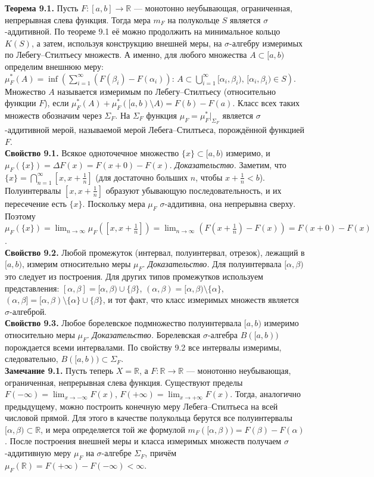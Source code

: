 \documentclass[12pt]{article}
\begin{document}
\textbf{Теорема 9.1.} Пусть $F:[a,b]\to\mathbb{R}$ — монотонно неубывающая, ограниченная, непрерывная слева функция. Тогда мера $m_F$ на полукольце $S$ является $\sigma$-аддитивной. По теореме 9.1 её можно продолжить на минимальное кольцо $K(S)$, а затем, используя конструкцию внешней меры, на $\sigma$-алгебру измеримых по Лебегу–Стилтьесу множеств. А именно, для любого множества $A\subset[a,b)$ определим внешнюю меру: $\mu_F^*(A)=\inf\left(\sum_{i=1}^\infty(F(\beta_i)-F(\alpha_i)):\,A\subset\bigcup_{i=1}^\infty[\alpha_i,\beta_i),\,[\alpha_i,\beta_i)\in S\right)$. Множество $A$ называется измеримым по Лебегу–Стилтьесу (относительно функции $F$), если $\mu_F^*(A)+\mu_F^*([a,b)\setminus A)=F(b)-F(a)$. Класс всех таких множеств обозначим через $\Sigma_F$. На $\Sigma_F$ функция $\mu_F=\mu_F^*|_{\Sigma_F}$ является $\sigma$-аддитивной мерой, называемой мерой Лебега–Стилтьеса, порождённой функцией $F$. \\\textbf{Свойство 9.1.} Всякое одноточечное множество $\{x\}\subset[a,b)$ измеримо, и $\mu_F(\{x\})=\Delta F(x)=F(x+0)-F(x)$. \textit{Доказательство.} Заметим, что $\{x\}=\bigcap_{n=1}^\infty[x,x+\tfrac{1}{n}]$ (для достаточно больших $n$, чтобы $x+\tfrac{1}{n}<b$). Полуинтервалы $[x,x+\tfrac{1}{n}]$ образуют убывающую последовательность, и их пересечение есть $\{x\}$. Поскольку мера $\mu_F$ $\sigma$-аддитивна, она непрерывна сверху. Поэтому $\mu_F(\{x\})=\lim_{n\to\infty}\mu_F([x,x+\tfrac{1}{n}])=\lim_{n\to\infty}(F(x+\tfrac{1}{n})-F(x))=F(x+0)-F(x)$. \\\textbf{Свойство 9.2.} Любой промежуток (интервал, полуинтервал, отрезок), лежащий в $[a,b)$, измерим относительно меры $\mu_F$. \textit{Доказательство.} Для полуинтервала $[\alpha,\beta)$ это следует из построения. Для других типов промежутков используем представления: $[\alpha,\beta]=[\alpha,\beta)\cup\{\beta\}$, $(\alpha,\beta)=[\alpha,\beta)\setminus\{\alpha\}$, $(\alpha,\beta]=[\alpha,\beta)\setminus\{\alpha\}\cup\{\beta\}$, и тот факт, что класс измеримых множеств является $\sigma$-алгеброй. \\\textbf{Свойство 9.3.} Любое борелевское подмножество полуинтервала $[a,b)$ измеримо относительно меры $\mu_F$. \textit{Доказательство.} Борелевская $\sigma$-алгебра $B([a,b))$ порождается всеми интервалами. По свойству 9.2 все интервалы измеримы, следовательно, $B([a,b))\subset\Sigma_F$. \\\textbf{Замечание 9.1.} Пусть теперь $X=\mathbb{R}$, а $F:\mathbb{R}\to\mathbb{R}$ — монотонно неубывающая, ограниченная, непрерывная слева функция. Существуют пределы $F(-\infty)=\lim_{x\to-\infty}F(x)$, $F(+\infty)=\lim_{x\to+\infty}F(x)$. Тогда, аналогично предыдущему, можно построить конечную меру Лебега–Стилтьеса на всей числовой прямой. Для этого в качестве полукольца берутся все полуинтервалы $[\alpha,\beta)\subset\mathbb{R}$, и мера определяется той же формулой $m_F([\alpha,\beta))=F(\beta)-F(\alpha)$. После построения внешней меры и класса измеримых множеств получаем $\sigma$-аддитивную меру $\mu_F$ на $\sigma$-алгебре $\Sigma_F$, причём $\mu_F(\mathbb{R})=F(+\infty)-F(-\infty)<\infty$.
\end{document}
